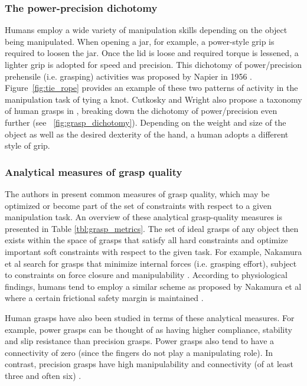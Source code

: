 \subsubsection*{The power-precision dichotomy}

Humans employ a wide variety of manipulation skills depending on the object being manipulated.
When opening a jar, for example, a power-style grip is required to loosen the jar.
Once the lid is loose and required torque is lessened, a lighter grip is adopted for speed and precision.
This dichotomy of power/precision prehensile (i.e. grasping) activities was proposed by Napier in 1956 \cite{napier1956prehensile}.
Figure~\ref{fig:tie_rope} provides an example of these two patterns of activity in the manipulation task of tying a knot.
Cutkosky and Wright also propose a taxonomy of human grasps in \cite{cutkosky1989grasp}, breaking down the dichotomy of power/precision even further (see ~\ref{fig:grasp_dichotomy}).
Depending on the weight and size of the object as well as the desired dexterity of the hand, a human adopts a different style of grip.


\subsubsection*{Analytical measures of grasp quality}
The authors in \cite{cutkosky1990human} present common measures of grasp quality, which may be optimized or become part of the set of constraints with respect to a given manipulation task.
An overview of these analytical grasp-quality measures is presented in Table \ref{tbl:grasp_metrics}.
The set of ideal grasps of any object then exists within the space of grasps that satisfy all hard constraints and optimize important soft constraints with respect to the given task.
For example, Nakamura et al search for grasps that minimize internal forces (i.e. grasping effort), subject to constraints on force closure and manipulability \cite{nakamura1987mechanics}.
According to physiological findings, humans tend to employ a similar scheme as proposed by Nakamura et al where a certain frictional safety margin is maintained \cite{ring1968paper}.

Human grasps have also been studied in terms of these analytical measures.
For example, power grasps can be thought of as having higher compliance, stability and slip resistance than precision grasps.
Power grasps also tend to have a connectivity of zero (since the fingers do not play a manipulating role).
In contrast, precision grasps have high manipulability and connectivity (of at least three and often six) \cite{cutkosky1990human}.

